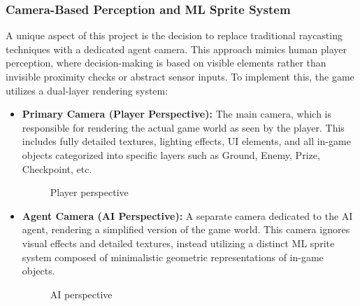 \documentclass[12pt,oneside,openright,a4paper]{cpe-english-project}
\begin{document}
\subsubsection{Camera-Based Perception and ML Sprite System}
A unique aspect of this project is the decision to replace traditional raycasting techniques with a dedicated agent camera. This approach mimics human player perception, where decision-making is based on visible elements rather than invisible proximity checks or abstract sensor inputs.
To implement this, the game utilizes a dual-layer rendering system:
\begin{itemize}
\item  \textbf{Primary Camera (Player Perspective):}
The main camera, which is responsible for rendering the actual game world as seen by the player. This includes fully detailed textures, lighting effects, UI elements, and all in-game objects categorized into specific layers such as Ground, Enemy, Prize, Checkpoint, etc.
\begin{figure}[!h]
\centering
{}
\caption{Player perspective}\label{fig:PlayerPers}
\end{figure}
\item  \textbf{Agent Camera (AI Perspective):}
A separate camera dedicated to the AI agent, rendering a simplified version of the game world. This camera ignores visual effects and detailed textures, instead utilizing a distinct ML sprite system composed of minimalistic geometric representations of in-game objects.
\begin{figure}[!h]
\centering
{}
\caption{AI perspective}\label{fig:AIPers}
\end{figure}
\end{itemize}
\end{document}
